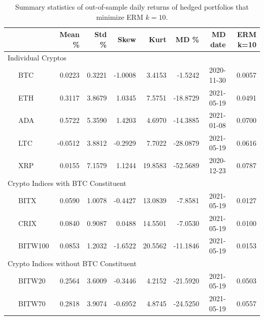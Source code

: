 \documentclass[11pt,a4paper,english]{article}
\begin{document}
{\begin{table}[!]
\end{table}\begin{table}[!] \centering %
  {%
\begin{tabular}{lrrrrrrr} \toprule
         {} &    Mean \% &     Std \% &      Skew &       Kurt &         MD \% &     MD date & ERM k=10 \\
\midrule
     \multicolumn{7}{l}{Individual Cryptos}                                                                                 \\
\ \ \ BTC     &  0.0223 &  0.3221 & -1.0008 &   3.4153 &  -1.5242 &  2020-11-30 &    0.0057 \\
\ \ \ ETH     &  0.3117 &  3.8679 &  1.0345 &   7.5751 & -18.8729 &  2021-05-19 &    0.0491 \\
\ \ \ ADA     &  0.5722 &  5.3590 &  1.4203 &   4.6970 & -14.3885 &  2021-01-08 &    0.0700 \\
\ \ \ LTC     & -0.0512 &  3.8812 & -0.2929 &   7.7022 & -28.0879 &  2021-05-19 &    0.0616 \\
\ \ \ XRP     &  0.0155 &  7.1579 &  1.1244 &  19.8583 & -52.5689 &  2020-12-23 &    0.0787 \\
   \multicolumn{7}{l}{Crypto Indices with BTC Constituent}                                                                  \\
\ \ \ BITX    &  0.0590 &  1.0078 & -0.4427 &  13.0839 &  -7.8581 &  2021-05-19 &    0.0127 \\
\ \ \ CRIX    &  0.0840 &  0.9087 &  0.0488 &  14.5501 &  -7.0530 &  2021-05-19 &    0.0100 \\
\ \ \ BITW100 &  0.0853 &  1.2032 & -1.6522 &  20.5562 & -11.1846 &  2021-05-19 &    0.0153 \\
    \multicolumn{7}{l}{Crypto Indices without BTC Constituent}                                                              \\
\ \ \ BITW20  &  0.2564 &  3.6009 & -0.3446 &   4.2152 & -21.5920 &  2021-05-19 &    0.0503 \\
\ \ \ BITW70  &  0.2818 &  3.9074 & -0.6952 &   4.8745 & -24.5250 &  2021-05-19 &    0.0557 \\
\bottomrule
\end{tabular}}
\caption{Summary statistics of out-of-sample daily returns of hedged portfolios that minimize ERM $k=10$.}
\label{tab:ERM_rh}

\end{table}
}

\clearpage
\end{document}
